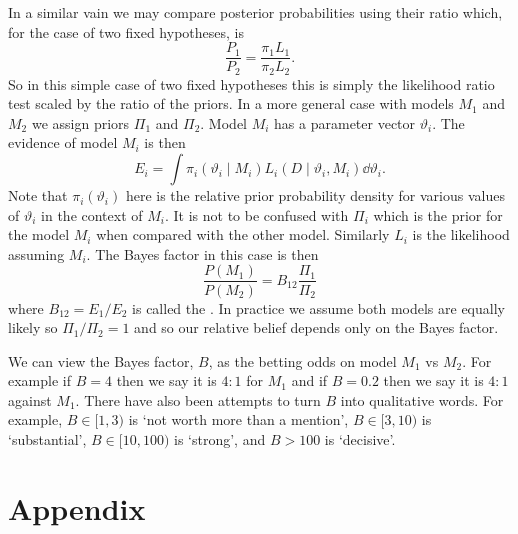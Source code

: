 \documentclass[a4paper]{article}
\newcommand{\st}{\mid}
\begin{document}
    In a similar vain we may compare posterior probabilities using their ratio which, for the case of two fixed hypotheses, is
    \[\frac{P_1}{P_2} = \frac{\pi_1L_1}{\pi_2 L_2}.\]
    So in this simple case of two fixed hypotheses this is simply the likelihood ratio test scaled by the ratio of the priors.
    In a more general case with models \(M_1\) and \(M_2\) we assign priors \(\Pi_1\) and \(\Pi_2\).
    Model \(M_i\) has a parameter vector \(\vartheta_i\).
    The evidence of model \(M_i\) is then
    \[E_i = \int \pi_i(\vartheta_i\st M_i)L_i(D\st \vartheta_i, M_i) \dd{\vartheta_i}.\]
    Note that \(\pi_i(\vartheta_i)\) here is the relative prior probability density for various values of \(\vartheta_i\) in the context of \(M_i\).
    It is not to be confused with \(\Pi_i\) which is the prior for the model \(M_i\) when compared with the other model.
    Similarly \(L_i\) is the likelihood assuming \(M_i\).
    The Bayes factor in this case is then
    \[\frac{P(M_1)}{P(M_2)} = B_{12}\frac{\Pi_1}{\Pi_2}\]
    where \(B_{12} = E_1 / E_2\) is called the .
    In practice we assume both models are equally likely so \(\Pi_1/\Pi_2 = 1\) and so our relative belief depends only on the Bayes factor.
    
    We can view the Bayes factor, \(B\), as the betting odds on model \(M_1\) vs \(M_2\).
    For example if \(B = 4\) then we say it is \(4:1\) for \(M_1\) and if \(B = 0.2\) then we say it is \(4:1\) against \(M_1\).
    There have also been attempts to turn \(B\) into qualitative words.
    For example, \(B\in [1, 3)\) is `not worth more than a mention', \(B\in [3, 10)\) is `substantial', \(B \in [10, 100)\) is `strong', and \(B > 100\) is `decisive'.
    \clearpage
    \appendix
    \part*{Appendix}
    
    
    \printbibliography[heading=bibintoc]
\end{document}

